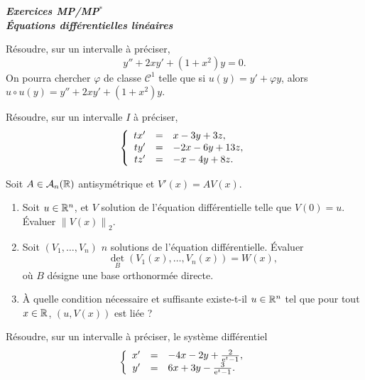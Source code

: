 \documentclass[12pt]{article}
\begin{document}
\begin{titlepage}
	\centering
	\vspace*{\fill}
	\Huge \textit{\textbf{Exercices MP/MP$^*$\\ Équations différentielles linéaires}}
	\vspace*{\fill}
\end{titlepage}

\begin{exercise}
	Résoudre, sur un intervalle à préciser,
	\begin{equation*}
		y''+2xy'+(1+x^{2})y=0.
	\end{equation*}
	On pourra chercher $\varphi$ de classe $\mathcal{C}^{1}$ telle que si $u(y)=y'+\varphi y$, alors $u\circ u(y)=y''+2xy'+(1+x^{2})y$.
\end{exercise}

\begin{exercise}
	Résoudre, sur un intervalle $I$ à préciser,
	\begin{equation*}
		\left\lbrace
			\begin{array}[]{rcl}
				tx' &=& x-3y+3z,\\
				ty' &=& -2x-6y+13z,\\
				tz' &=& -x-4y+8z.
			\end{array}
		\right.
	\end{equation*}
\end{exercise}

\begin{exercise}
	Soit $A\in\mathcal{A}_n(\mathbb{R})$ antisymétrique et $V'(x)=AV(x)$.
	\begin{enumerate}
		\item Soit $u\in\mathbb{R}^{n}$, et $V$ solution de l'équation différentielle telle que $V(0)=u$. Évaluer $\left\lVert V(x)\right\rVert_{2}$.
		\item Soit $(V_1,\dots,V_n)$ $n$ solutions de l'équation différentielle. Évaluer 
		\begin{equation*}
			\det_{B}(V_1(x),\dots,V_n(x))=W(x),	
		\end{equation*}
		où $B$ désigne une base orthonormée directe.
		\item À quelle condition nécessaire et suffisante existe-t-il $u\in\mathbb{R}^{n}$ tel que pour tout $x\in\mathbb{R}$, $(u,V(x))$ est liée ?
	\end{enumerate}
\end{exercise}

\begin{exercise}
	Résoudre, sur un intervalle à préciser, le système différentiel
	\begin{equation*}
		\left\lbrace
			\begin{array}[]{rcl}
				x' &=& -4x-2y+\frac{2}{\e^{t}-1},\\
				y' &=& 6x+3y-\frac{3}{\e^{t}-1}.
			\end{array}
		\right.
	\end{equation*}
\end{exercise}
\end{document}
